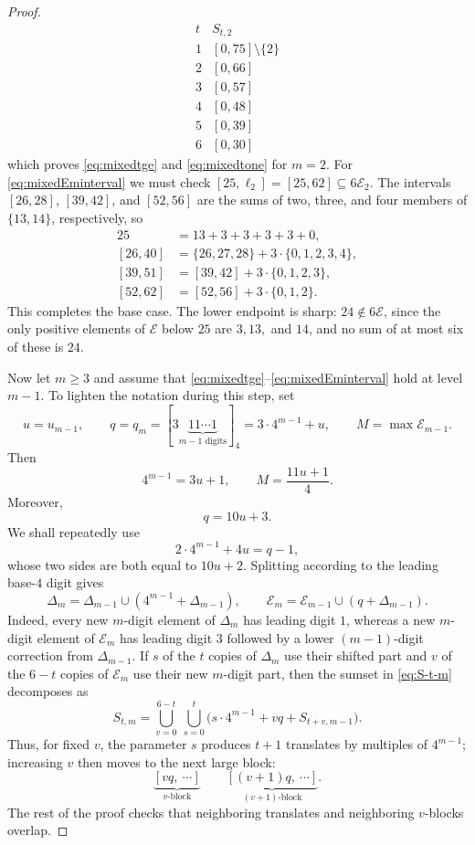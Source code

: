 \documentclass[12pt]{article}
\theoremstyle{plain}
\theoremstyle{definition}
\theoremstyle{plain}
\begin{document}
\begin{proof}
\[
\begin{array}{c|c}
t&S_{t,2}\\ \hline
1&[0,75]\setminus\{2\}\\
2&[0,66]\\
3&[0,57]\\
4&[0,48]\\
5&[0,39]\\
6&[0,30]
\end{array}
\]
which proves \eqref{eq:mixedtge} and \eqref{eq:mixedtone} for $m=2$.
For \eqref{eq:mixedEminterval} we must check
$[25,\ell_2]=[25,62]\subseteq6\mathcal E_2$.  The intervals $[26,28]$,
$[39,42]$, and $[52,56]$ are the sums of two, three, and four members of
$\{13,14\}$, respectively, so
\[
\begin{aligned}
25&=13+3+3+3+3+0,\\
[26,40]&=\{26,27,28\}+3\cdot\{0,1,2,3,4\},\\
[39,51]&=[39,42]+3\cdot\{0,1,2,3\},\\
[52,62]&=[52,56]+3\cdot\{0,1,2\}.
\end{aligned}
\]
This completes the base case.  The lower endpoint is sharp:
$24\notin6\mathcal E$, since the only positive elements of $\mathcal E$
below $25$ are $3,13,$ and $14$, and no sum of at most six of these is
$24$.

Now let $m\geq3$ and assume that
\eqref{eq:mixedtge}--\eqref{eq:mixedEminterval} hold at level $m-1$.
To lighten the notation during this step, set
\[
 u=u_{m-1},\qquad
 q=q_m=[3\underbrace{11\cdots1}_{m-1\text{ digits}}]_4
      =3\cdot4^{m-1}+u,\qquad
 M=\max\mathcal E_{m-1}.
\]
Then
\[
 4^{m-1}=3u+1,\qquad
 M=\frac{11u+1}{4}.
\]
Moreover,
\begin{equation}\label{eq:qmdef}
 q=10u+3.
\end{equation}
We shall repeatedly use
\begin{equation}\label{eq:qoverlap}
 2\cdot4^{m-1}+4u=q-1,
\end{equation}
whose two sides are both equal to $10u+2$.  Splitting according to the
leading base-$4$ digit gives
\[
 \Delta_m=\Delta_{m-1}\cup(4^{m-1}+\Delta_{m-1}),\qquad
 \mathcal E_{m}=\mathcal E_{m-1}\cup(q+\Delta_{m-1}).
\]
Indeed, every new $m$-digit element of $\Delta_m$ has leading digit $1$,
whereas a new $m$-digit element of $\mathcal E_{m}$ has leading digit $3$
followed by a lower $(m-1)$-digit correction from $\Delta_{m-1}$.  If $s$ of
the $t$ copies of $\Delta_m$ use their shifted part and $v$ of the $6-t$
copies of $\mathcal E_{m}$ use their new $m$-digit part, then the sumset in
\eqref{eq:S-t-m} decomposes as
\begin{equation}\label{eq:decomp}
 S_{t,m}=\bigcup_{v=0}^{6-t}\ \bigcup_{s=0}^{t}
 \bigl(s\cdot4^{m-1}+vq+S_{t+v,m-1}\bigr).
\end{equation}
Thus, for fixed $v$, the parameter $s$ produces $t+1$ translates by
multiples of $4^{m-1}$; increasing $v$ then moves to the next large block:
\[
 \underbrace{[vq,\ \cdots]}_{v\text{-block}}
 \qquad
 \underbrace{[(v+1)q,\ \cdots]}_{(v+1)\text{-block}}.
\]
The rest of the proof checks that neighboring translates and neighboring
$v$-blocks overlap.


\end{proof}
\end{document}
